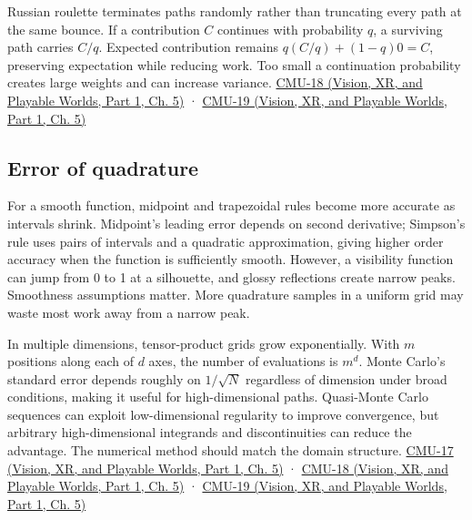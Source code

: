 Russian roulette terminates paths randomly rather than truncating every path at the same bounce. If a contribution \(C\) continues with probability \(q\), a surviving path carries \(C/q\). Expected contribution remains \(q(C/q)+(1-q)0=C\), preserving expectation while reducing work. Too small a continuation probability creates large weights and can increase variance. \href{../07-Vision-XR-and-Playable-Worlds-P01/main.pdf\#04-visual-computing-ii-ch036-cmu-18---monte-carlo-rendering}{CMU-18 (Vision, XR, and Playable Worlds, Part 1, Ch. 5)} · \href{../07-Vision-XR-and-Playable-Worlds-P01/main.pdf\#04-visual-computing-ii-ch036-cmu-19---variance-reduction}{CMU-19 (Vision, XR, and Playable Worlds, Part 1, Ch. 5)}

\subsection{Error of quadrature}\label{03-visual-computing-i-ch012-error-of-quadrature}

\hypertarget{03-visual-computing-i-ch012-error-of-quadrature}{}

For a smooth function, midpoint and trapezoidal rules become more accurate as intervals shrink. Midpoint's leading error depends on second derivative; Simpson's rule uses pairs of intervals and a quadratic approximation, giving higher order accuracy when the function is sufficiently smooth. However, a visibility function can jump from 0 to 1 at a silhouette, and glossy reflections create narrow peaks. Smoothness assumptions matter. More quadrature samples in a uniform grid may waste most work away from a narrow peak.

In multiple dimensions, tensor-product grids grow exponentially. With \(m\) positions along each of \(d\) axes, the number of evaluations is \(m^d\). Monte Carlo's standard error depends roughly on \(1/\sqrt{N}\) regardless of dimension under broad conditions, making it useful for high-dimensional paths. Quasi-Monte Carlo sequences can exploit low-dimensional regularity to improve convergence, but arbitrary high-dimensional integrands and discontinuities can reduce the advantage. The numerical method should match the domain structure. \href{../07-Vision-XR-and-Playable-Worlds-P01/main.pdf\#04-visual-computing-ii-ch036-cmu-17---numerical-integration}{CMU-17 (Vision, XR, and Playable Worlds, Part 1, Ch. 5)} · \href{../07-Vision-XR-and-Playable-Worlds-P01/main.pdf\#04-visual-computing-ii-ch036-cmu-18---monte-carlo-rendering}{CMU-18 (Vision, XR, and Playable Worlds, Part 1, Ch. 5)} · \href{../07-Vision-XR-and-Playable-Worlds-P01/main.pdf\#04-visual-computing-ii-ch036-cmu-19---variance-reduction}{CMU-19 (Vision, XR, and Playable Worlds, Part 1, Ch. 5)}

